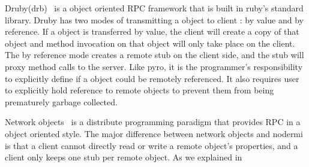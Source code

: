 Druby(drb)~\cite{druby} is a object oriented RPC framework that is built in ruby's standard library.
Druby has two modes of transmitting a object to client : by value and by reference.
If a object is transferred by value, the client will create a copy of that object and method
invocation on that object will only take place on the client.
The by reference mode creates a remote stub on the client side, and the stub will proxy 
method calls to the server.
Like pyro, it is the programmer's responsibility to explicitly define if a object could be
remotely referenced.
It also requires user to explicitly hold reference to remote objects to prevent them from being 
prematurely garbage collected. 

Network objects~\cite{birrell1993distributed} is a distribute programming paradigm
that provides RPC in a object oriented style.
The major difference between network objects and nodermi is that 
a client cannot directly read or write a remote object's properties,
and a client only keeps one stub per remote object.
As we explained in %
